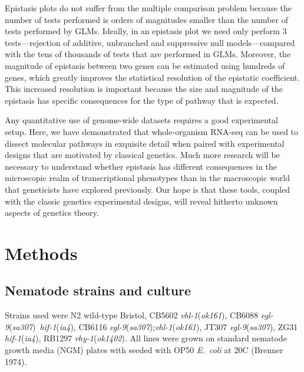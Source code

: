 \documentclass[10pt, onecolumn]{article}
\newcommand{\ecol}{\emph{E.~coli}}
\newcommand{\gene}[1]{\emph{#1}}
\begin{document}
Epistasis plots do not suffer from the multiple comparison problem because the
number of tests performed is orders of magnitudes smaller than the number
of tests performed by GLMs. Ideally, in an epistasis plot we need only perform
3 tests---rejection of additive, unbranched and suppressive null models---compared
with the tens of thousands of tests that are performed in GLMs. Moreover, the
magnitude of epistasis between two genes can be estimated using hundreds of genes,
which greatly improves the statistical resolution of the epistatic coefficient.
This increased resolution is important because the size and magnitude of the
epistasis has specific consequences for the type of pathway that is expected.

Any quantitative use of genome-wide datasets requires a good experimental setup.
Here, we have demonstrated that whole-organism RNA-seq can be used to dissect
molecular pathways in exquisite detail when paired with experimental designs that
are motivated by classical genetics. Much more research will be necessary
to understand whether epistasis has different consequences in the microscopic
realm of transcriptional phenotypes than in the macroscopic world that geneticists
have explored previously. Our hope is that these tools, coupled with the classic
genetics experimental  designs, will reveal hitherto unknown aspects of genetics
theory.

\section*{Methods}
\label{sec:methods}
\subsection*{Nematode strains and culture}
Strains used were N2 wild-type Bristol,
CB5602 \gene{vhl-1}(\emph{ok161}),
CB6088 \gene{egl-9}(\emph{sa307})~\gene{hif-1}(\emph{ia4}),
CB6116 \gene{egl-9}(\emph{sa307});\gene{vhl-1}(\emph{ok161}),
JT307 \gene{egl-9}(\emph{sa307}),
ZG31 \gene{hif-1}(\emph{ia4}),
RB1297 \gene{rhy-1}(\emph{ok1402}).
All lines were grown on standard
nematode growth media (NGM) plates with seeded with OP50 \ecol{} at 20\degree{}C
(Brenner 1974).
\end{document}
